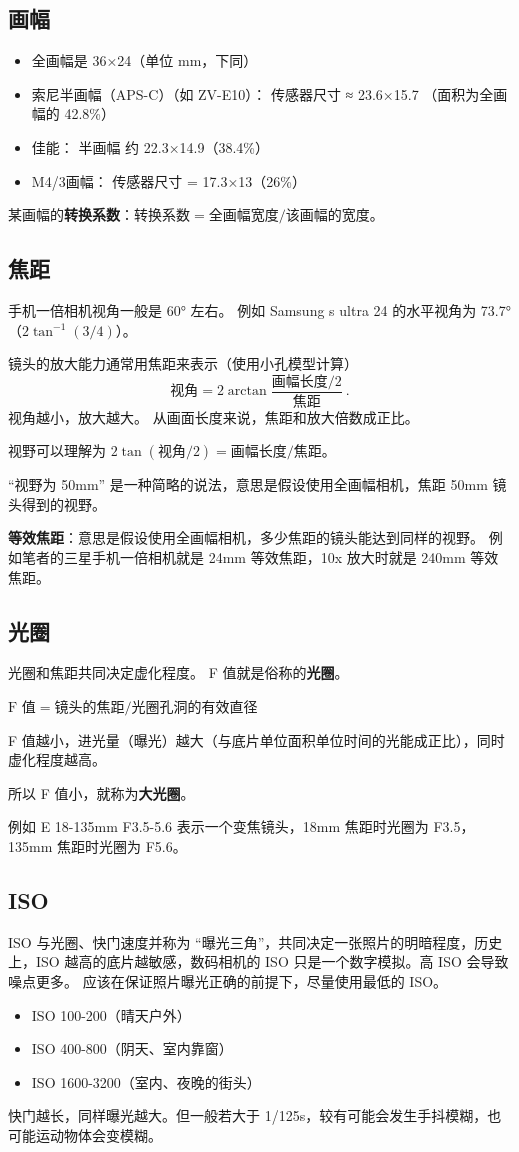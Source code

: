 
\subsection{画幅}
\begin{itemize}
\item 全画幅是 36×24（单位 mm，下同）
\item 索尼半画幅（APS-C）（如 ZV-E10）： 传感器尺寸 ≈ 23.6×15.7 （面积为全画幅的 42.8\%）
\item 佳能： 半画幅 约 22.3×14.9（38.4\%）
\item M4/3画幅： 传感器尺寸 = 17.3×13（26\%）
\end{itemize}

某画幅的\textbf{转换系数}：$\text{转换系数} = \text{全画幅宽度}/\text{该画幅的宽度}$。

\subsection{焦距}
手机一倍相机视角一般是 60° 左右。 例如 Samsung s ultra 24 的水平视角为 73.7°（$2\tan^{-1}(3/4)$）。

镜头的放大能力通常用焦距来表示（使用小孔模型计算）
\begin{equation}
\text{视角} = 2\arctan{\frac{\text{画幅长度/2}}{\text{焦距}}}~.
\end{equation}
视角越小，放大越大。 从画面长度来说，焦距和放大倍数成正比。

视野可以理解为 $2\tan(\text{视角}/2) = \text{画幅长度}/{\text{焦距}}$。

“视野为 50mm” 是一种简略的说法，意思是假设使用全画幅相机，焦距 50mm 镜头得到的视野。

\textbf{等效焦距}：意思是假设使用全画幅相机，多少焦距的镜头能达到同样的视野。 例如笔者的三星手机一倍相机就是 24mm 等效焦距，10x 放大时就是 240mm 等效焦距。


\subsection{光圈}
光圈和焦距共同决定虚化程度。 F 值就是俗称的\textbf{光圈}。

$\text{F 值} = \text{镜头的焦距}/\text{光圈孔洞的有效直径}$

F 值越小，进光量（曝光）越大（与底片单位面积单位时间的光能成正比），同时虚化程度越高。

所以 F 值小，就称为\textbf{大光圈}。

例如 E 18-135mm F3.5-5.6 表示一个变焦镜头，18mm 焦距时光圈为 F3.5， 135mm 焦距时光圈为 F5.6。

\subsection{ISO}
ISO 与光圈、快门速度并称为 “曝光三角”，共同决定一张照片的明暗程度，历史上，ISO 越高的底片越敏感，数码相机的 ISO 只是一个数字模拟。高 ISO 会导致噪点更多。 应该在保证照片曝光正确的前提下，尽量使用最低的 ISO。
\begin{itemize}
\item ISO 100-200（晴天户外）
\item ISO 400-800（阴天、室内靠窗）
\item ISO 1600-3200（室内、夜晚的街头）
\end{itemize}
快门越长，同样曝光越大。但一般若大于 1/125s，较有可能会发生手抖模糊，也可能运动物体会变模糊。
